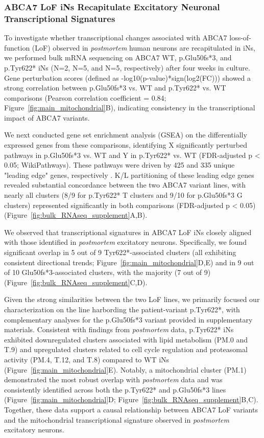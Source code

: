 \subsubsection{ABCA7 LoF iNs Recapitulate Excitatory Neuronal Transcriptional Signatures}
To investigate whether transcriptional changes associated with ABCA7 loss-of-function (LoF) observed in \emph{postmortem} human neurons are recapitulated in iNs, we performed bulk mRNA sequencing on ABCA7 WT, p.Glu50fs*3, and p.Tyr622* iNs (N=2, N=5, and N=5, respectively) after four weeks in culture. Gene perturbation scores (defined as -log10(p-value)*sign(log2(FC))) showed a strong correlation between p.Glu50fs*3 vs. WT and p.Tyr622* vs. WT comparisons (Pearson correlation coefficient = 0.84; Figure~\ref{fig:main_mitochondrial}B), indicating consistency in the transcriptional impact of ABCA7 variants.

We next conducted gene set enrichment analysis (GSEA) on the differentially expressed genes from these comparisons, identifying X significantly perturbed pathways in p.Glu50fs*3 vs. WT and Y in p.Tyr622* vs. WT (FDR-adjusted p < 0.05; WikiPathways). These pathways were driven by 425 and 335 unique "leading edge" genes, respectively \cite{Subramanian2005-pu}. K/L partitioning of these leading edge genes revealed substantial concordance between the two ABCA7 variant lines, with nearly all clusters (8/9 for p.Tyr622* T clusters and 9/10 for p.Glu50fs*3 G clusters) represented significantly in both comparisons (FDR-adjusted p < 0.05) (Figure~\ref{fig:bulk_RNAseq_supplement}A,B).

We observed that transcriptional signatures in ABCA7 LoF iNs closely aligned with those identified in \textit{postmortem} excitatory neurons. Specifically, we found significant overlap in 5 out of 9 Tyr622*-associated clusters (all exhibiting consistent directional trends; Figure~\ref{fig:main_mitochondrial}D,E) and in 9 out of 10 Glu50fs*3-associated clusters, with the majority (7 out of 9) (Figure~\ref{fig:bulk_RNAseq_supplement}C,D).

Given the strong similarities between the two LoF lines, we primarily focused our characterization on the line harbording the patient-variant p.Tyr622*, with complementary analyses for the p.Glu50fs*3 variant provided in supplementary materials. Consistent with findings from \textit{postmortem} data, p.Tyr622* iNs exhibited downregulated clusters associated with lipid metabolism (PM.0 and T.9) and upregulated clusters related to cell cycle regulation and proteasomal activity (PM.4, T.12, and T.8) compared to WT iNs (Figure~\ref{fig:main_mitochondrial}E). Notably, a mitochondrial cluster (PM.1) demonstrated the most robust overlap with \textit{postmortem} data and was consistently identified across both the p.Tyr622* and p.Glu50fs*3 lines (Figure~\ref{fig:main_mitochondrial}D; Figure~\ref{fig:bulk_RNAseq_supplement}B,C). Together, these data support a causal relationship between ABCA7 LoF variants and the mitochondrial transcriptional signature observed in \textit{postmortem} excitatory neurons.


